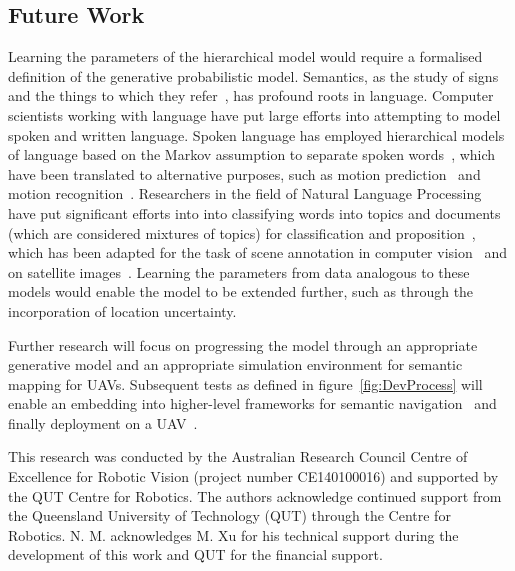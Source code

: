 \documentclass[twocolumn,letterpaper]{IEEEAerospaceCLS}  %
\begin{document}
\subsection{Future Work} \label{ssec:Fut}
Learning the parameters of the hierarchical model would require a formalised definition of the generative probabilistic model. Semantics, as the study of signs and the things to which they refer~\cite{kostavelis_semantic_2015}, has profound roots in language. Computer scientists working with language have put large efforts into attempting to model spoken and written language. Spoken language has employed hierarchical models of language based on the Markov assumption to separate spoken words~\cite{fine_hierarchical_1998,murphy_dynamic_2002}, which have been translated to alternative purposes, such as motion prediction~\cite{li_layered_2015} and motion recognition~\cite{oliver_layered_2002,aarno_layered_2006}. Researchers in the field of Natural Language Processing have put significant efforts into into classifying words into topics and documents (which are considered mixtures of topics) for classification and proposition~\cite{blei_latent_2003,hofmann_unsupervised_2001}, which has been adapted for the task of scene annotation in computer vision~\cite{bosch_scene_2006,fei-fei_bayesian_2005} and on satellite images~\cite{lienou_semantic_2010}. Learning the parameters from data analogous to these models would enable the model to be extended further, such as through the incorporation of location uncertainty.

Further research will focus on progressing the model through an appropriate generative model and an appropriate simulation environment for semantic mapping for UAVs. Subsequent tests as defined in figure~\ref{fig:DevProcess} will enable an embedding into higher-level frameworks for semantic navigation~\cite{mandel_towards_2020,vanegas_uncertainty_2016} and finally deployment on a UAV~\cite{mandel_method_2020}.

\acknowledgments
This research was conducted by the Australian Research Council Centre of Excellence for Robotic Vision (project number CE140100016) and supported by the QUT Centre for Robotics. The authors acknowledge continued support from the Queensland University of Technology (QUT) through the Centre for Robotics. N. M. acknowledges M. Xu for his technical support during the development of this work and QUT for the financial support.
\end{document}
